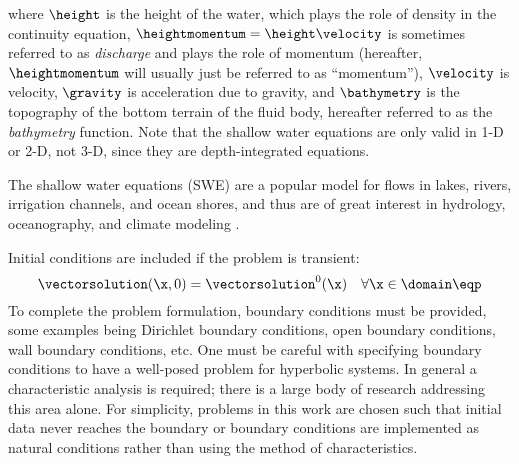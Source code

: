 where $\height$ is the height of the water, which plays the role of density
in the continuity equation, $\heightmomentum=\height\velocity$ is sometimes
referred to as \emph{discharge} and plays the role of momentum (hereafter,
$\heightmomentum$ will usually just be referred to as ``momentum''),
$\velocity$ is velocity, $\gravity$
is acceleration due to gravity, and $\bathymetry$ is the topography of the
bottom terrain of the fluid body, hereafter referred to as the \emph{bathymetry}
function.
Note that the shallow water equations are only valid in 1-D or 2-D, not 3-D,
since they are depth-integrated equations.

The shallow water equations (SWE) are a popular model for flows in lakes, rivers,
irrigation channels, and ocean shores, and thus are of great interest
in hydrology, oceanography, and climate modeling\cite{bernetti2008}
\cite{fjordholm2011}.

Initial conditions are included if the problem is transient:
\begin{equation}
   \vectorsolution(\x,0) = \vectorsolution^0(\x)
   \quad \forall \x\in\domain \eqp
\end{equation}
To complete the problem formulation, boundary
conditions must be provided, some examples being
Dirichlet boundary conditions, open boundary conditions,
wall boundary conditions,
etc. One must be careful with specifying boundary conditions to have
a well-posed problem for hyperbolic systems.
In general a characteristic analysis is required; there is a large body of research
addressing this area alone. For simplicity, problems in this work are
chosen such that initial data never reaches the boundary
or boundary conditions are implemented as natural conditions
rather than using the method of characteristics.

